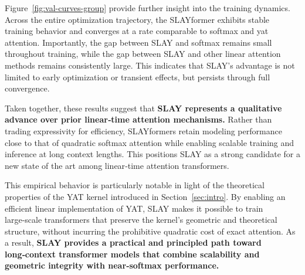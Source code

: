 \documentclass{article}
\begin{document}
\begin{figure}[h]
\end{figure}

Figure~\ref{fig:val-curves-group} provide further insight into the training dynamics.
Across the entire optimization trajectory, the SLAYformer exhibits stable training behavior and converges
at a rate comparable to softmax and yat attention.
Importantly, the gap between SLAY and softmax remains small throughout training, while the gap between SLAY
and other linear attention methods remains consistently large.
This indicates that SLAY’s advantage is not limited to early optimization or transient effects, but persists
through full convergence.

Taken together, these results suggest that \textbf{SLAY represents a qualitative advance over prior linear‑time
attention mechanisms.}
Rather than trading expressivity for efficiency, SLAYformers retain modeling performance close to that of
quadratic softmax attention while enabling scalable training and inference at long context lengths.
This positions SLAY as a strong candidate for a new state of the art among linear‑time attention transformers.

This empirical behavior is particularly notable in light of the theoretical properties of the YAT kernel
introduced in Section~\ref{sec:intro}.
By enabling an efficient linear implementation of YAT, SLAY makes it possible to train large‑scale
transformers that preserve the kernel’s geometric and theoretical structure, without incurring the
prohibitive quadratic cost of exact attention.
As a result, \textbf{SLAY provides a practical and principled path toward long‑context transformer models that
combine scalability and geometric integrity with near‑softmax performance.}
\end{document}
